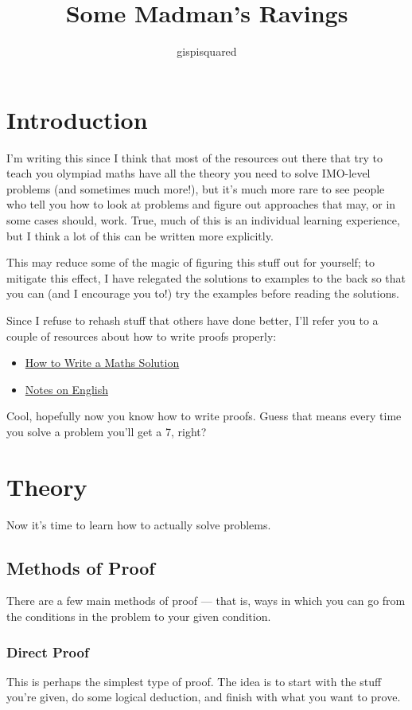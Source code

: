 \documentclass{amsart}
\title{Some Madman's Ravings}
\author{gispisquared}
\begin{document}
\maketitle
\tableofcontents
\newpage
\section{Introduction}
I'm writing this since I think that most of the resources out there that try to
teach you olympiad maths have all the theory you need to solve IMO-level
problems (and sometimes much more!), but it's much more rare to see people who
tell you how to look at problems and figure out approaches that may, or in some
cases should, work. True, much of this is an individual learning experience, but
I think a lot of this can be written more explicitly.

This may reduce some of the magic of figuring this stuff out for yourself; to
mitigate this effect, I have relegated the solutions to examples to the back so
that you can (and I encourage you to!) try the examples before reading the
solutions.

Since I refuse to rehash stuff that others have done better, I'll refer you to a
couple of resources about how to write proofs properly:
\begin{itemize}
  \item
    \href{https://artofproblemsolving.com/news/articles/how-to-write-a-solution}
    {How to Write a Maths Solution}
  \item \href{https://web.evanchen.cc/handouts/english/english.pdf}{Notes on
    English}
\end{itemize}

Cool, hopefully now you know how to write proofs. Guess that means every time
you solve a problem you'll get a 7, right?
\newpage
\section{Theory}
Now it's time to learn how to actually solve problems.
\subsection{Methods of Proof}
There are a few main methods of proof --- that is, ways in which you can go from
the conditions in the problem to your given condition.

\subsubsection{Direct Proof}
This is perhaps the simplest type of proof. The idea is to start with the stuff
you're given, do some logical deduction, and finish with what you want to prove.
\end{document}
